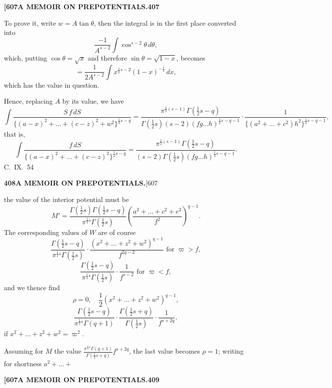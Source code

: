 \documentclass[11pt,a4paper]{article}
\begin{document}
{\newpage
\noindent\textbf{[607}\hspace{\fill}\textbf{A MEMOIR ON PREPOTENTIALS.}\hspace{\fill}\textbf{407}

To prove it, write $w = A\tan\theta$, then the integral is in the first place converted into
\[
\frac{-1}{A^{s-2}} \int \cos^{s-2}\theta\, d\theta,
\]
which, putting $\cos\theta = \sqrt{x}$ and therefore $\sin\theta = \sqrt{1-x}$, becomes
\[
= \frac{1}{2A^{s-2}} \int x^{\frac{1}{2}s-2}(1-x)^{-\frac{1}{2}}\, dx,
\]
which has the value in question.

Hence, replacing $A$ by its value, we have
\[
\int \frac{S\,f\,dS}{\{(a-x)^2 + \ldots + (c-z)^2 + w^2\}^{\frac{1}{2}s-q}} = \frac{\pi^{\frac{1}{2}(s-1)}\Gamma(\frac{1}{2}s-q)}{\Gamma(\frac{1}{2}s)(s-2)(fg\ldots h)^{\frac{1}{2}s-q-1}} \cdot \frac{1}{\{(a^2 + \ldots + c^2)h^2\}^{\frac{1}{2}s-q-1}},
\]
that is,
\[
\int \frac{f\,dS}{\{(a-x)^2 + \ldots + (c-z)^2\}^{\frac{1}{2}s-q}} = \frac{\pi^{\frac{1}{2}(s-1)}\Gamma(\frac{1}{2}s-q)}{(s-2)\Gamma(\frac{1}{2}s)(fg\ldots h)^{\frac{1}{2}s-q-1}}.
\]
\hfill C.~IX.\ 54

\newpage
\noindent\textbf{408}\hspace{\fill}\textbf{A MEMOIR ON PREPOTENTIALS.}\hspace{\fill}[607

the value of the interior potential must be
\[
M' = \frac{\Gamma(\frac{1}{2}s)\Gamma(\frac{1}{2}s-q)}{\pi^{\frac{1}{2}s}\Gamma(\frac{1}{2}s)} \left(\frac{a^2 + \ldots + c^2 + e^2}{f^2}\right)^{q-1}.
\]
The corresponding values of $W$ are of course
\[
\frac{\Gamma(\frac{1}{2}s-q)}{\pi^{\frac{1}{2}s}\Gamma(\frac{1}{2}s)} \cdot \frac{(x^2 + \ldots + z^2 + w^2)^{q-1}}{f^{2q-2}} \text{ for } \varpi > f,
\]
\[
\frac{\Gamma(\frac{1}{2}s-q)}{\pi^{\frac{1}{2}s}\Gamma(\frac{1}{2}s)} \cdot \frac{1}{f^{s-2}} \text{ for } \varpi < f,
\]
and we thence find
\[
\rho = 0,\quad \frac{1}{2}(x^2 + \ldots + z^2 + w^2)^{q-1},
\]
\[
\frac{\Gamma(\frac{1}{2}s-q)}{\pi^{\frac{1}{2}s}\Gamma(q+1)} \cdot \frac{\Gamma(\frac{1}{2}s+q)}{\Gamma(\frac{1}{2}s)} \cdot \frac{1}{f^{s+2q}},
\]
if $x^2 + \ldots + z^2 + w^2 = \varpi^2$.

Assuming for $M$ the value $\frac{\pi^{\frac{1}{2}s}\Gamma(q+1)}{\Gamma(\frac{1}{2}s+q)}f^{s+2q}$, the last value becomes $\rho = 1$; writing for shortness $a^2 + \ldots + $

\newpage
\noindent\textbf{[607}\hspace{\fill}\textbf{A MEMOIR ON PREPOTENTIALS.}\hspace{\fill}\textbf{409}

}
\end{document}
